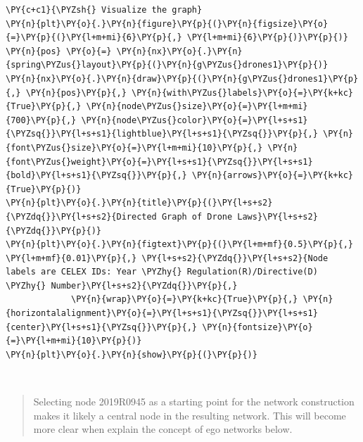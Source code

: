     \begin{tcolorbox}[breakable, size=fbox, boxrule=1pt, pad at break*=1mm,colback=cellbackground, colframe=cellborder]
\begin{Verbatim}[commandchars=\\\{\}]
\PY{c+c1}{\PYZsh{} Visualize the graph}
\PY{n}{plt}\PY{o}{.}\PY{n}{figure}\PY{p}{(}\PY{n}{figsize}\PY{o}{=}\PY{p}{(}\PY{l+m+mi}{6}\PY{p}{,} \PY{l+m+mi}{6}\PY{p}{)}\PY{p}{)}
\PY{n}{pos} \PY{o}{=} \PY{n}{nx}\PY{o}{.}\PY{n}{spring\PYZus{}layout}\PY{p}{(}\PY{n}{g\PYZus{}drones1}\PY{p}{)} 
\PY{n}{nx}\PY{o}{.}\PY{n}{draw}\PY{p}{(}\PY{n}{g\PYZus{}drones1}\PY{p}{,} \PY{n}{pos}\PY{p}{,} \PY{n}{with\PYZus{}labels}\PY{o}{=}\PY{k+kc}{True}\PY{p}{,} \PY{n}{node\PYZus{}size}\PY{o}{=}\PY{l+m+mi}{700}\PY{p}{,} \PY{n}{node\PYZus{}color}\PY{o}{=}\PY{l+s+s1}{\PYZsq{}}\PY{l+s+s1}{lightblue}\PY{l+s+s1}{\PYZsq{}}\PY{p}{,} \PY{n}{font\PYZus{}size}\PY{o}{=}\PY{l+m+mi}{10}\PY{p}{,} \PY{n}{font\PYZus{}weight}\PY{o}{=}\PY{l+s+s1}{\PYZsq{}}\PY{l+s+s1}{bold}\PY{l+s+s1}{\PYZsq{}}\PY{p}{,} \PY{n}{arrows}\PY{o}{=}\PY{k+kc}{True}\PY{p}{)}
\PY{n}{plt}\PY{o}{.}\PY{n}{title}\PY{p}{(}\PY{l+s+s2}{\PYZdq{}}\PY{l+s+s2}{Directed Graph of Drone Laws}\PY{l+s+s2}{\PYZdq{}}\PY{p}{)}
\PY{n}{plt}\PY{o}{.}\PY{n}{figtext}\PY{p}{(}\PY{l+m+mf}{0.5}\PY{p}{,} \PY{l+m+mf}{0.01}\PY{p}{,} \PY{l+s+s2}{\PYZdq{}}\PY{l+s+s2}{Node labels are CELEX IDs: Year \PYZhy{} Regulation(R)/Directive(D) \PYZhy{} Number}\PY{l+s+s2}{\PYZdq{}}\PY{p}{,} 
             \PY{n}{wrap}\PY{o}{=}\PY{k+kc}{True}\PY{p}{,} \PY{n}{horizontalalignment}\PY{o}{=}\PY{l+s+s1}{\PYZsq{}}\PY{l+s+s1}{center}\PY{l+s+s1}{\PYZsq{}}\PY{p}{,} \PY{n}{fontsize}\PY{o}{=}\PY{l+m+mi}{10}\PY{p}{)}
\PY{n}{plt}\PY{o}{.}\PY{n}{show}\PY{p}{(}\PY{p}{)}
\end{Verbatim}
\end{tcolorbox}

    \begin{center}
    \end{center}
    { \hspace*{\fill} \\}
    
    \begin{quote}
Selecting node 2019R0945 as a starting point for the network
construction makes it likely a central node in the resulting network.
This will become more clear when explain the concept of ego networks
below.
\end{quote}

